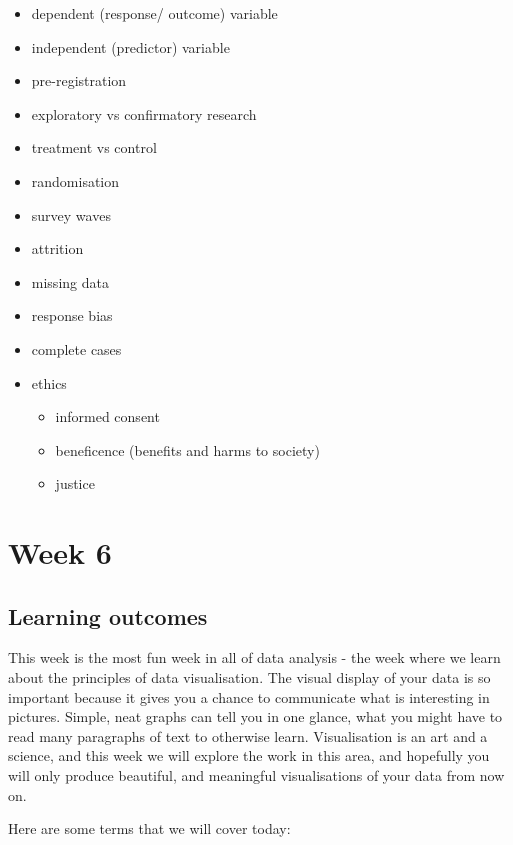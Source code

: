 \documentclass[
]{book}
\providecommand{\tightlist}{%
  \setlength{\itemsep}{0pt}\setlength{\parskip}{0pt}}
\begin{document}
\begin{itemize}
\tightlist
\item
  dependent (response/ outcome) variable
\item
  independent (predictor) variable
\item
  pre-registration
\item
  exploratory vs confirmatory research
\item
  treatment vs control
\item
  randomisation
\item
  survey waves
\item
  attrition
\item
  missing data
\item
  response bias
\item
  complete cases
\item
  ethics

  \begin{itemize}
  \tightlist
  \item
    informed consent
  \item
    beneficence (benefits and harms to society)
  \item
    justice
  \end{itemize}
\end{itemize}

\hypertarget{week6}{%
\chapter{Week 6}\label{week6}}

\hypertarget{learning-outcomes-5}{%
\section{Learning outcomes}\label{learning-outcomes-5}}

This week is the most fun week in all of data analysis - the week where we learn about the principles of data visualisation. The visual display of your data is so important because it gives you a chance to communicate what is interesting in pictures. Simple, neat graphs can tell you in one glance, what you might have to read many paragraphs of text to otherwise learn. Visualisation is an art and a science, and this week we will explore the work in this area, and hopefully you will only produce beautiful, and meaningful visualisations of your data from now on.

Here are some terms that we will cover today:
\end{document}
